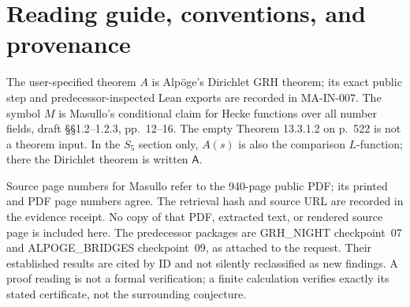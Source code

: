 \documentclass[11pt,a4paper]{article}
\begin{document}
\begin{abstract}
$(\mathcal R_B)$, we prove the central equality $\beta=b+n$.
The proof extracts an integer positive-definite function from the
signed discrepancy divisor, then uses the coset-ring theorem and
prime-frequency independence to exclude the positive-excess branch.
Without assuming that real-zero hypothesis, failure of comparison
forces a shared real zero above the center, with normal-closure
multiplicity at least nine and an explicit discriminant-dependent
endpoint exclusion, sharpened by the reflected real zero, all gamma
terms, and a discriminant-aware lower contribution from every prime.
Boundary positivity alone does not supply
the ordinary Fourier identity needed to exclude that branch.
The general Hecke zero-location input remains necessary for the
stated all-factor GRH consequence. PF26's invoked algebraic
proofs pass a full reading; the bad-prime reduction is complete
relative to that input, and its residual analytic family is reduced
to explicit single Kummer Hecke functions. The four-way input register
covers 563 inherited findings with all secondary premises retained.
No unresolved assertion is promoted to a theorem in this paper.
\end{abstract}
\begingroup
\small
\setlength{\parskip}{0pt}
\tableofcontents
\endgroup
\newpage

\section*{Reading guide, conventions, and provenance}
The user-specified theorem $A$ is Alp\"oge's Dirichlet GRH theorem;
its exact public step and predecessor-inspected Lean exports are
recorded in MA-IN-007. The symbol $M$ is Masullo's conditional
claim for Hecke functions over all number fields, draft
\S\S1.2--1.2.3, pp.~12--16. The empty Theorem 13.3.1.2 on p.~522
is not a theorem input. In the $S_5$ section only, $A(s)$ is also
the comparison $L$-function; there the Dirichlet theorem is
written $\mathsf A$.

Source page numbers for Masullo refer to the 940-page public PDF;
its printed and PDF page numbers agree. The retrieval hash and
source URL are recorded in the evidence receipt. No copy of that
PDF, extracted text, or rendered source page is included here.
The predecessor packages are GRH\_NIGHT checkpoint~07 and
ALPOGE\_BRIDGES checkpoint~09, as attached to the request.
Their established results are cited by ID and not silently
reclassified as new findings. A proof reading is not a formal
verification; a finite calculation verifies exactly its stated
certificate, not the surrounding conjecture.
\end{document}
